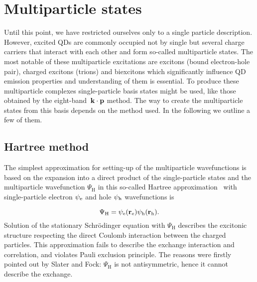 \section{Multiparticle states}
%
Until this point, we have restricted ourselves only to a single particle description. However, excited QDs are commonly occupied not by single but several charge carriers that interact with each other and form so-called multiparticle states. The most notable of these multiparticle excitations are excitons (bound electron-hole pair), charged excitons (trions) and biexcitons which significantly influence QD emission properties and understanding of them is essential. To produce these multiparticle complexes single-particle basis states might be used, like those obtained by the eight-band~$\bf{k\cdot p}$ method. The way to create the multiparticle states from this basis depends on the method used. In the following we outline a few of them.

\subsection{Hartree method}
The simplest approximation for setting-up of the multiparticle wavefunctions is based on the expansion into a direct product of the single-particle states and the multiparticle wavefunction $\Psi_\mathrm{H}$ in this so-called Hartree approximation~\citep{Ashcroft, Hartree_1928} with single-particle electron $\psi_{\rm{e}}$ and hole $\psi_{\rm{h}}$ wavefunctions is 


\begin{equation}
\label{hartree}
\Psi_\mathrm{H}=\psi_{\rm{e}}(\mathbf{r}_{\rm{e}})\psi_{\rm{h}}(\mathbf{r}_{\rm{h}}).
\end{equation}
%
Solution of the stationary Schrödinger equation with $\Psi_\mathrm{H}$ describes the excitonic structure respecting the direct Coulomb interaction between the charged particles. This approximation fails to describe the exchange interaction and correlation, and violates Pauli exclusion principle. The reasons were firstly pointed out by Slater and Fock: $\Psi_\mathrm{H}$ is not antisymmetric, hence it cannot describe the exchange.


